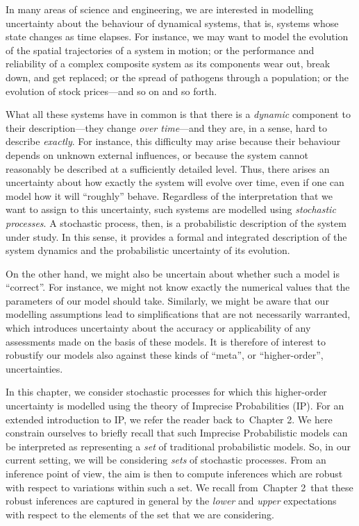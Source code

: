 \documentclass[graybox]{svmult}
\def\refIPChapter{Chapter 2}
\begin{document}
In many areas of science and engineering, we are interested in modelling uncertainty about the behaviour of dynamical systems, that is, systems whose state changes as time elapses. For instance, we may want to model the evolution of the spatial trajectories of a system in motion; or the performance and reliability of a complex composite system as its components wear out, break down, and get replaced; or the spread of pathogens through a population; or the evolution of stock prices---and so on and so forth. 

What all these systems have in common is that there is a \emph{dynamic} component to their description---they change \emph{over time}---and they are, in a sense, hard to describe \emph{exactly}. For instance, this difficulty may arise because their behaviour depends on unknown external influences, or because the system cannot reasonably be described at a sufficiently detailed level. Thus, there arises an uncertainty about how exactly the system will evolve over time, even if one can model how it will ``roughly'' behave.
Regardless of the interpretation that we want to assign to this uncertainty, such systems are modelled using \emph{stochastic processes}. A stochastic process, then, is a probabilistic description of the system under study. In this sense, it provides a formal and integrated description of the system dynamics and the probabilistic uncertainty of its evolution.

On the other hand, we might also be uncertain about whether such a model is ``correct''. For instance, we might not know exactly the numerical values that the parameters of our model should take. Similarly, we might be aware that our modelling assumptions lead to simplifications that are not necessarily warranted, which introduces uncertainty about the accuracy or applicability of any assessments made on the basis of these models. It is therefore of interest to robustify our models also against these kinds of ``meta'', or ``higher-order'', uncertainties.

In this chapter, we consider stochastic processes for which this higher-order uncertainty is modelled using the theory of Imprecise Probabilities (IP). For an extended introduction to IP, we refer the reader back to~\refIPChapter. We here constrain ourselves to briefly recall that such Imprecise Probabilistic models can be interpreted as representing a \emph{set} of traditional probabilistic models. So, in our current setting, we will be considering \emph{sets} of stochastic processes. From an inference point of view, the aim is then to compute inferences which are robust with respect to variations within such a set. We recall from~\refIPChapter~that these robust inferences are captured in general by the \emph{lower} and \emph{upper} expectations with respect to the elements of the set that we are considering.
\end{document}
